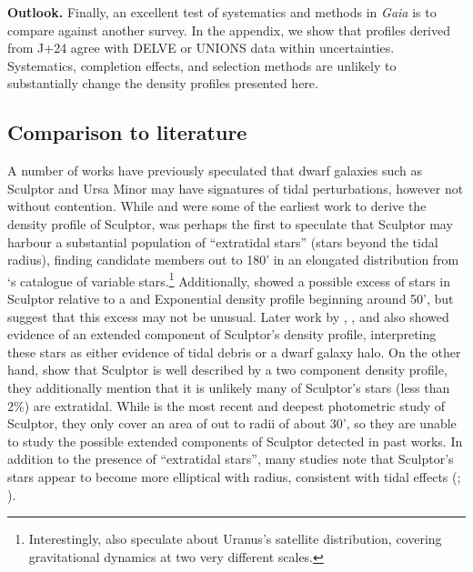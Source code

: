 \textbf{Outlook.} Finally, an excellent test of systematics and methods
in \emph{Gaia} is to compare against another survey. In the appendix, we
show that profiles derived from J+24 agree with DELVE or UNIONS data
within uncertainties. Systematics, completion effects, and selection
methods are unlikely to substantially change the density profiles
presented here.

\subsection{Comparison to literature}\label{comparison-to-literature}

A number of works have previously speculated that dwarf galaxies such as
Sculptor and Ursa Minor may have signatures of tidal perturbations,
however not without contention. While \citet{hodge1961} and
\citet{demers+krautter+kunkel1980} were some of the earliest work to
derive the density profile of Sculptor, \citet{innanen+papp1979} was
perhaps the first to speculate that Sculptor may harbour a substantial
population of ``extratidal stars'' (stars beyond the tidal radius),
finding candidate members out to 180' in an elongated distribution from
\citet{vanagt1978}`s catalogue of variable stars.\footnote{Interestingly,
  \citet{innanen+papp1979} also speculate about Uranus's satellite
  distribution, covering gravitational dynamics at two very different
  scales.} Additionally, \citet{eskridge1988} showed a possible excess
of stars in Sculptor relative to a \citet{king1962} and Exponential
density profile beginning around 50', but suggest that this excess may
not be unusual. Later work by \citet{IH1995}, \citet{walcher+2003}, and
\citet{westfall+2006} also showed evidence of an extended component of
Sculptor's density profile, interpreting these stars as either evidence
of tidal debris or a dwarf galaxy halo. On the other hand,
\citet{coleman+dacosta+bland-hawthorn2005} show that Sculptor is well
described by a two component density profile, they additionally mention
that it is unlikely many of Sculptor's stars (less than 2\%) are
extratidal. While \citet{munoz+2018} is the most recent and deepest
photometric study of Sculptor, they only cover an area of out to radii
of about 30', so they are unable to study the possible extended
components of Sculptor detected in past works. In addition to the
presence of ``extratidal stars'', many studies note that Sculptor's
stars appear to become more elliptical with radius, consistent with
tidal effects (\citet{IH1995}; \citet{westfall+2006}).

